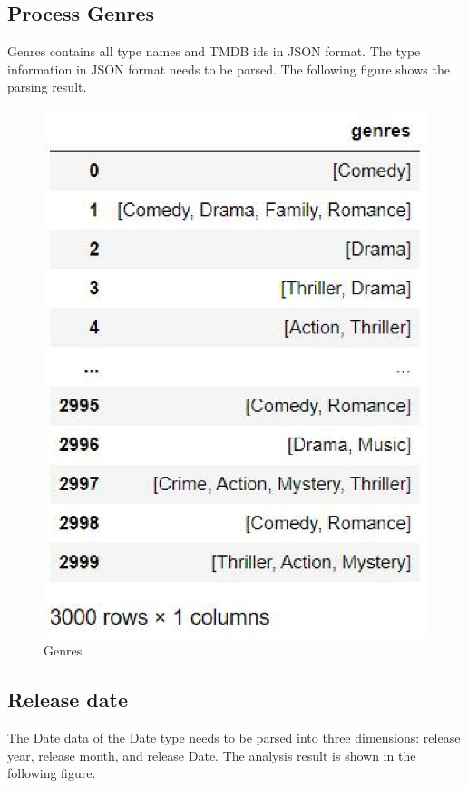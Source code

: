 \subsection{Process Genres}
Genres contains all type names and TMDB ids in JSON format.
The type information in JSON format needs to be parsed. The following figure shows the parsing result. \\

\begin{figure}[htbp]
  \includegraphics[scale=0.5]{./figures/genres.eps}
  \caption{Genres}
\end{figure}


\subsection{Release date}
The Date data of the Date type needs to be parsed into three dimensions: release year, release month, and release Date. 
The analysis result is shown in the following figure. \\

